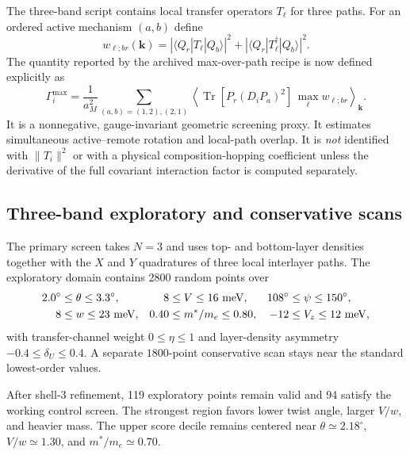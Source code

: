 \documentclass[11pt]{article}
\theoremstyle{remark}
\newcommand{\Tr}{\operatorname{Tr}}
\newcommand{\bmk}{\bm k}
\begin{document}
The three-band script contains local transfer operators $T_\ell$ for three paths.  For an ordered active mechanism $(a,b)$ define
\begin{equation}
 w_{\ell;br}(\bmk)=
 |\langle Q_r|T_\ell|Q_b\rangle|^2
 +|\langle Q_r|T_\ell^\dagger|Q_b\rangle|^2.
\end{equation}
The quantity reported by the archived max-over-path recipe is now defined explicitly as
\begin{equation}
 \boxed{
 \Gamma_i^{\max}=\frac1{a_M^2}
 \sum_{(a,b)=(1,2),(2,1)}
 \left\langle
 \Tr[P_r(D_iP_a)^2]\,
 \max_\ell w_{\ell;br}
 \right\rangle_{\bmk}.}
 \label{eq:Gamma-max-definition}
\end{equation}
It is a nonnegative, gauge-invariant geometric screening proxy.  It estimates simultaneous active--remote rotation and local-path overlap.  It is \emph{not} identified with $\|T_i\|^2$ or with a physical composition-hopping coefficient unless the derivative of the full covariant interaction factor is computed separately.

\subsection{Three-band exploratory and conservative scans}

The primary screen takes $N=3$ and uses top- and bottom-layer densities together with the $X$ and $Y$ quadratures of three local interlayer paths.  The exploratory domain contains $2800$ random points over
\begin{align}
2.0^\circ&\le\theta\le3.3^\circ,&
8&\le V\le16~{\rm meV},&
108^\circ&\le\psi\le150^\circ,\nonumber\\
8&\le w\le23~{\rm meV},&
0.40&\le m^*/m_e\le0.80,&
-12&\le V_z\le12~{\rm meV},
\end{align}
with transfer-channel weight $0\le\eta\le1$ and layer-density asymmetry $-0.4\le\delta_U\le0.4$.  A separate $1800$-point conservative scan stays near the standard lowest-order values.

After shell-$3$ refinement, 119 exploratory points remain valid and 94 satisfy the working control screen.  The strongest region favors lower twist angle, larger $V/w$, and heavier mass.  The upper score decile remains centered near $\theta\simeq2.18^\circ$, $V/w\simeq1.30$, and $m^*/m_e\simeq0.70$.
\end{document}
